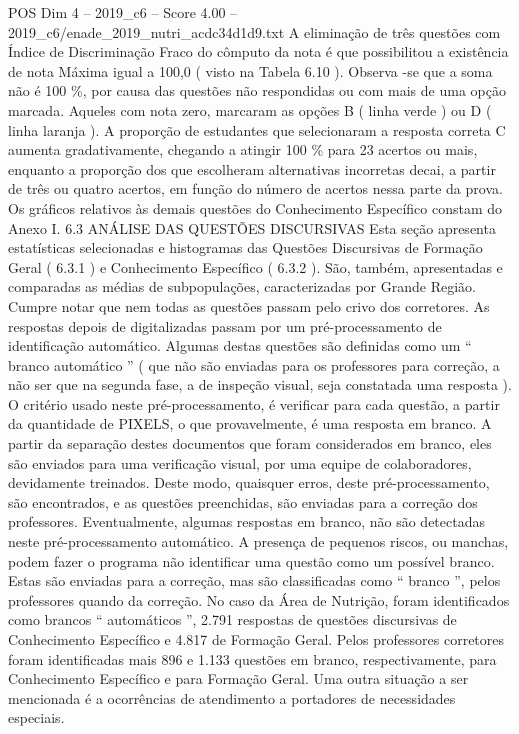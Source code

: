 \begin{textsample}{POS Dim 4 – 2019\_c6 – Score 4.00 – 2019\_c6/enade\_2019\_nutri\_acdc34d1d9.txt}
A eliminação de três questões com Índice de Discriminação Fraco do cômputo da nota é que possibilitou a existência de nota Máxima igual a 100,0 ( visto na Tabela 6.10 ).
Observa -se que a soma não é 100 \%, por causa das questões não respondidas ou com mais de uma opção marcada.
Aqueles com nota zero, marcaram as opções B ( linha verde ) ou D ( linha laranja ).
A proporção de estudantes que selecionaram a resposta correta C aumenta gradativamente, chegando a atingir 100 \% para 23 acertos ou mais, enquanto a proporção dos que escolheram alternativas incorretas decai, a partir de três ou quatro acertos, em função do número de acertos nessa parte da prova.
Os gráficos relativos às demais questões do Conhecimento Específico constam do Anexo I. 6.3 ANÁLISE DAS QUESTÕES DISCURSIVAS Esta seção apresenta estatísticas selecionadas e histogramas das Questões Discursivas de Formação Geral ( 6.3.1 ) e Conhecimento Específico ( 6.3.2 ).
São, também, apresentadas e comparadas as médias de subpopulações, caracterizadas por Grande Região.
Cumpre notar que nem todas as questões passam pelo crivo dos corretores.
As respostas depois de digitalizadas passam por um pré-processamento de identificação automático.
Algumas destas questões são definidas como um “ branco automático ” ( que não são enviadas para os professores para correção, a não ser que na segunda fase, a de inspeção visual, seja constatada uma resposta ).
O critério usado neste pré-processamento, é verificar para cada questão, a partir da quantidade de PIXELS, o que provavelmente, é uma resposta em branco.
A partir da separação destes documentos que foram considerados em branco, eles são enviados para uma verificação visual, por uma equipe de colaboradores, devidamente treinados.
Deste modo, quaisquer erros, deste pré-processamento, são encontrados, e as questões preenchidas, são enviadas para a correção dos professores.
Eventualmente, algumas respostas em branco, não são detectadas neste pré-processamento automático.
A presença de pequenos riscos, ou manchas, podem fazer o programa não identificar uma questão como um possível branco.
Estas são enviadas para a correção, mas são classificadas como “ branco ”, pelos professores quando da correção.
No caso da Área de Nutrição, foram identificados como brancos “ automáticos ”, 2.791 respostas de questões discursivas de Conhecimento Específico e 4.817 de Formação Geral.
Pelos professores corretores foram identificadas mais 896 e 1.133 questões em branco, respectivamente, para Conhecimento Específico e para Formação Geral.
Uma outra situação a ser mencionada é a ocorrências de atendimento a portadores de necessidades especiais.

\end{textsample}

